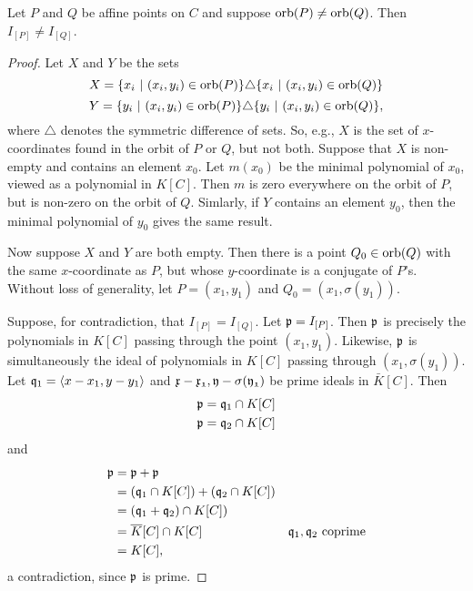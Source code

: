 \begin{proposition}
  Let $P$ and $Q$ be affine points on $C$ and suppose $\orb(P) \neq \orb(Q)$.
  Then $I_{[P]} \neq I_{[Q]}$.
\end{proposition}
\begin{proof}
  Let $X$ and $Y$ be the sets
    \[ X = \{ x_i ~|~ (x_i, y_i) \in \orb(P) \} \triangle \{ x_i ~|~ (x_i, y_i) \in \orb(Q) \} \]
    \[ Y = \{ y_i ~|~ (x_i, y_i) \in \orb(P) \} \triangle \{ y_i ~|~ (x_i, y_i) \in \orb(Q) \}, \]
    where $\triangle$ denotes the symmetric difference of sets.
  So, e.g., $X$ is the set of $x$-coordinates found in the orbit of $P$ or $Q$, but not both.
  Suppose that $X$ is non-empty and contains an element $x_0$.
  Let $m(x_0)$ be the minimal polynomial of $x_0$, viewed as a polynomial in $K[C]$.
  Then $m$ is zero everywhere on the orbit of $P$, but is non-zero on the orbit of $Q$.
  Simlarly, if $Y$ contains an element $y_0$, then the minimal polynomial of $y_0$ gives the same result.

  Now suppose $X$ and $Y$ are both empty.
  Then there is a point $Q_0 \in \orb(Q)$ with the same $x$-coordinate as $P$, but whose $y$-coordinate is a conjugate of $P$'s.
  Without loss of generality, let $P = (x_1, y_1)$ and $Q_0 = (x_1, \sigma(y_1))$.
  
  Suppose, for contradiction, that $I_{[P]} = I_{[Q]}$.
  Let $\frak p = I_{[P]}$.
  Then $\frak p$ is precisely the polynomials in $K[C]$ passing through the point $(x_1, y_1)$.
  Likewise, $\frak p$ is simultaneously the ideal of polynomials in $K[C]$ passing through $(x_1, \sigma(y_1))$.
  Let $\frak q_1 = \pid{x - x_1, y - y_1}$ and $\frak{x - x_1, y - \sigma(y_1)}$ be prime ideals in $\bar K[C]$.
  Then
  \begin{align*}
    \frak p &= \frak q_1 \cap K[C] \\
    \frak p &= \frak q_2 \cap K[C]
  \end{align*}
  and
  \begin{align*}
    \frak p
      &= \frak p + \frak p \\
      &= (\frak q_1 \cap K[C]) + (\frak q_2 \cap K[C]) \\
      &= (\frak q_1 + \frak q_2) \cap K[C]) \\
      &= \bar K[C] \cap K[C] & \text{$\frak q_1, \frak q_2$ coprime} \\
      &= K[C],
  \end{align*}
  a contradiction, since $\frak p$ is prime.
\end{proof}

